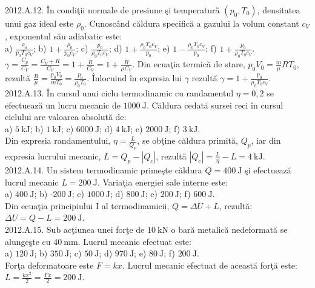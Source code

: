 2012.A.12. În condiţii normale de presiune şi temperatură $\left(p_{0}, T_{0}\right)$, densitatea unui gaz ideal este $\rho_{0}$. Cunoscând căldura specifică a gazului la volum constant $c_{V}$, exponentul său adiabatic este:\\ a) $\frac{\rho_{0}}{p_{0} T_{0} c_{V}}$; b) $1+\frac{\rho_{0}}{p_{0} c_{V}}$; c) $\frac{p_{0}}{\rho_{0} T_{0} c_{V}}$; d) $1+\frac{\rho_{0} T_{0} c_{V}}{p_{0}}$; e) $1-\frac{\rho_{0} T_{0} c_{V}}{p_{0}}$; f) $1+\frac{p_{0}}{\rho_{0} T_{0} c_{V}}$.\\ $\gamma=\frac{C_{p}}{C_{V}}=\frac{C_{V}+R}{C_{V}}=1+\frac{R}{C_{V}}=1+\frac{R}{\mu C_{V}}$. Din ecuaţia termică de stare, $p_{0} V_{0}=\frac{m}{\mu} R T_{0}$, rezultă $\frac{R}{\mu}=\frac{p_{0} V_{0}}{m T_{0}}=\frac{p_{0}}{\rho_{0} T_{0}}$. Înlocuind în expresia lui $\gamma$ rezultă $\gamma=1+\frac{p_{0}}{\rho_{0} T_{0} c_{V}}$.\\

2012.A.13. În cursul unui ciclu termodinamic cu randamentul $\eta=0,2$ se efectuează un lucru mecanic de $1000 \mathrm{~J}$. Căldura cedată sursei reci în cursul ciclului are valoarea absolută de:\\ a) $5 \mathrm{~kJ}$; b) $1 \mathrm{~kJ}$; c) $6000 \mathrm{~J}$; d) $4 \mathrm{~kJ}$; e) $2000 \mathrm{~J}$; f) $3 \mathrm{~kJ}$.\\ Din expresia randamentului, $\eta=\frac{L}{Q_{p}}$, se obţine căldura primită, $Q_{p}$, iar din expresia lucrului mecanic, $L=Q_{p}-\left|Q_{c}\right|$, rezultă $\left|Q_{c}\right|=\frac{L}{\eta}-L=4 \mathrm{~kJ}$.\\

2012.A.14. Un sistem termodinamic primeşte căldura $Q=400 \mathrm{~J}$ şi efectuează lucrul mecanic $L=200 \mathrm{~J}$. Variaţia energiei sale interne este:\\ a) $400 \mathrm{~J}$; b) -$200 \mathrm{~J}$; c) $1000 \mathrm{~J}$; d) $800 \mathrm{~J}$; e) $200 \mathrm{~J}$; f) $600 \mathrm{~J}$.\\ Din ecuaţia principiului I al termodinamicii, $Q=\Delta U+L$, rezultă:\\ $\Delta U=Q-L=200 \mathrm{~J}$.\\

2012.A.15. Sub acţiunea unei forţe de $10 \mathrm{~kN}$ o bară metalică nedeformată se alungeşte cu $40 \mathrm{~mm}$. Lucrul mecanic efectuat este:\\ a) $120 \mathrm{~J}$; b) $350 \mathrm{~J}$; c) $50 \mathrm{~J}$; d) $970 \mathrm{~J}$; e) $80 \mathrm{~J}$; f) $200 \mathrm{~J}$.\\ Forţa deformatoare este $F=k x$. Lucrul mecanic efectuat de această forţă este:\\ $L=\frac{k x^{2}}{2}=\frac{F x}{2}=200 \mathrm{~J}$.\\

